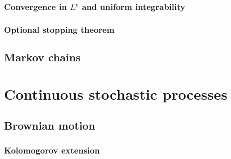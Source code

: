 \documentclass{../note}
\begin{document}
\begin{prb}
\begin{parts}
\item
\end{parts}
\end{prb}

\begin{prb}
\begin{parts}
\item
\end{parts}
\end{prb}

\section{Convergence in $L^p$ and uniform integrability}

\section{Optional stopping theorem}



\chapter{Markov chains}







\part{Continuous stochastic processes}





\chapter{Brownian motion}
\section{Kolomogorov extension}
\end{document}
